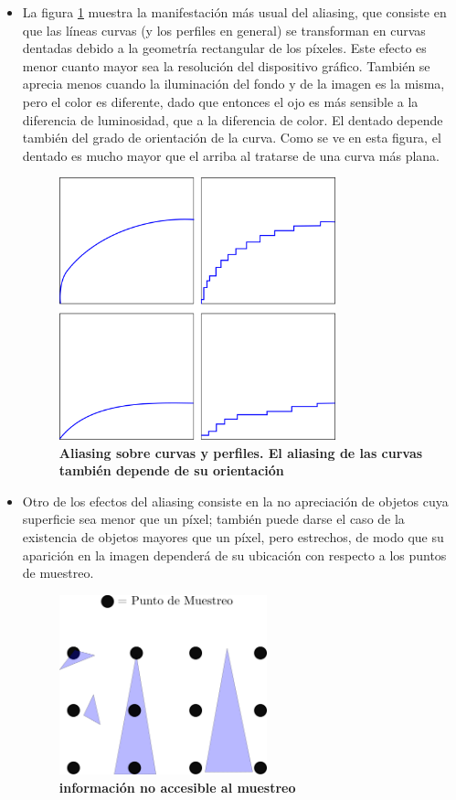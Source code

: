 \begin{enumerate}
    \begin{itemize}
        \item La figura \ref{fig:grafica17} muestra la manifestación más usual del aliasing, que consiste en que las líneas curvas (y los perfiles en general) se transforman en curvas dentadas debido a la geometría rectangular de los píxeles. Este efecto es menor cuanto mayor sea la resolución del dispositivo gráfico. También se aprecia menos cuando la iluminación del fondo y de la imagen es la misma, pero el color es diferente, dado que entonces el ojo es más sensible a la diferencia de luminosidad, que a la diferencia de color. El dentado depende también del grado de orientación de la curva. Como se ve en esta figura, el dentado es mucho mayor que el arriba al tratarse de una curva más plana.  
        \begin{figure}[h]
        \includegraphics[width=8cm]{Img/CPD/grafica17.png}
        \centering
        \caption{\textbf{\footnotesize{ Aliasing sobre curvas y perfiles. El aliasing de las curvas también depende de su orientación  }}}
        \label{fig:grafica17}
        \end{figure}
    
        \item Otro de los efectos del aliasing consiste en la no apreciación de objetos
        cuya superficie sea menor que un píxel; también puede darse el caso de la existencia de objetos mayores que un píxel, pero estrechos, de modo que su aparición en la imagen dependerá de su ubicación con respecto a los puntos de muestreo.

        \begin{figure}[h]
        \includegraphics[width=6cm]{Img/CPD/grafica18.png}
        \centering
        \caption{\textbf{\footnotesize{ información no accesible al muestreo   }}}
        \label{fig:grafica18}
        \end{figure}
        

\end{itemize}
\end{enumerate}

